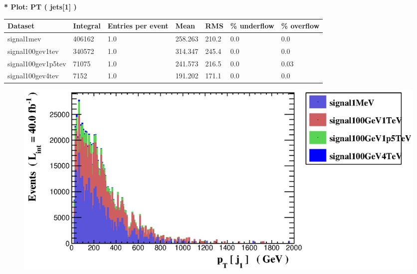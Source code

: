 \documentclass[a4paper, 10pt]{article}
\begin{document}
\textbf{* Plot: PT ( jets[1] ) }\\
   \begin{table}[H]
  \begin{center}
    \begin{tabular}{|m{23.0mm}|m{23.0mm}|m{18.0mm}|m{19.0mm}|m{19.0mm}|m{19.0mm}|m{19.0mm}|}
      \hline
      {\cellcolor{yellow}         Dataset}& {\cellcolor{yellow}         Integral}& {\cellcolor{yellow}         Entries per event}& {\cellcolor{yellow}         Mean}& {\cellcolor{yellow}         RMS}& {\cellcolor{yellow}         \% underflow}& {\cellcolor{yellow}         \% overflow}\\
      \hline
      {\cellcolor{white}         signal1mev}& {\cellcolor{white}         406162}& {\cellcolor{white}         1.0}& {\cellcolor{white}         258.263}& {\cellcolor{white}         210.2}& {\cellcolor{green}         0.0}& {\cellcolor{green}         0.0}\\
      \hline
      {\cellcolor{white}         signal100gev1tev}& {\cellcolor{white}         340572}& {\cellcolor{white}         1.0}& {\cellcolor{white}         314.347}& {\cellcolor{white}         245.4}& {\cellcolor{green}         0.0}& {\cellcolor{green}         0.0}\\
      \hline
      {\cellcolor{white}         signal100gev1p5tev}& {\cellcolor{white}         71075}& {\cellcolor{white}         1.0}& {\cellcolor{white}         241.573}& {\cellcolor{white}         216.5}& {\cellcolor{green}         0.0}& {\cellcolor{green}         0.03}\\
      \hline
      {\cellcolor{white}         signal100gev4tev}& {\cellcolor{white}         7152}& {\cellcolor{white}         1.0}& {\cellcolor{white}         191.202}& {\cellcolor{white}         171.1}& {\cellcolor{green}         0.0}& {\cellcolor{green}         0.0}\\
\hline
    \end{tabular}
  \end{center}
\end{table}

\begin{figure}[H]
  \begin{center}
    \includegraphics[scale=0.45]{selection_0.eps}\\
\caption{   }
  \end{center}
\end{figure}
      \newpage
\end{document}
